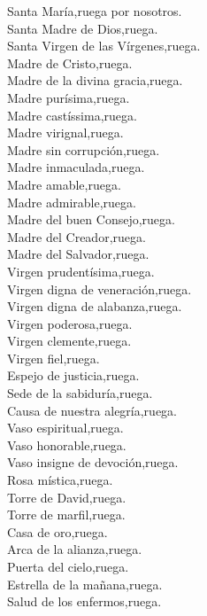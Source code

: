 Santa María,\hfill ruega por nosotros.\\
Santa Madre de Dios,\hfill ruega.\\
Santa Virgen de las Vírgenes,\hfill ruega.\\
Madre de Cristo,\hfill ruega.\\
Madre de la divina gracia,\hfill ruega.\\
Madre purísima,\hfill ruega.\\
Madre castíssima,\hfill ruega.\\
Madre virignal,\hfill ruega.\\
Madre sin corrupción,\hfill ruega.\\
Madre inmaculada,\hfill ruega.\\
Madre amable,\hfill ruega.\\
Madre admirable,\hfill ruega.\\
Madre del buen Consejo,\hfill ruega.\\
Madre del Creador,\hfill ruega.\\
Madre del Salvador,\hfill ruega.\\
Virgen prudentísima,\hfill ruega.\\
Virgen digna de veneración,\hfill ruega.\\
Virgen digna de alabanza,\hfill ruega.\\
Virgen poderosa,\hfill ruega.\\
Virgen clemente,\hfill ruega.\\
Virgen fiel,\hfill ruega.\\
Espejo de justicia,\hfill ruega.\\
Sede de la sabiduría,\hfill ruega.\\
Causa de nuestra alegría,\hfill ruega.\\
Vaso espiritual,\hfill ruega.\\
Vaso honorable,\hfill ruega.\\
Vaso insigne de devoción,\hfill ruega.\\
Rosa mística,\hfill ruega.\\
Torre de David,\hfill ruega.\\
Torre de marfil,\hfill ruega.\\
Casa de oro,\hfill ruega.\\
Arca de la alianza,\hfill ruega.\\
Puerta del cielo,\hfill ruega.\\
Estrella de la mañana,\hfill ruega.\\
Salud de los enfermos,\hfill ruega.\\

